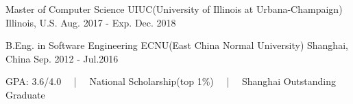 


\begin{cventries}


\cventryB
{Master of Computer Science} %
{UIUC(University of Illinois at Urbana-Champaign)} %
{Illinois, U.S.} %
{Aug. 2017 - Exp. Dec. 2018} %
{}

\cventry
{B.Eng. in Software Engineering} %
{ECNU(East China Normal University)} %
{Shanghai, China} %
{Sep. 2012 - Jul.2016} %
{ %
\begin{cvitems}
\item {GPA: 3.6/4.0 ~~|~~ National Scholarship(top 1\%) ~~|~~ Shanghai Outstanding Graduate}
\end{cvitems}
}



\end{cventries}